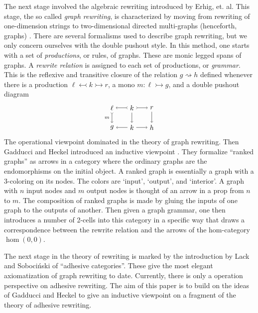 \documentclass{amsart}
\newcommand{\from}{\colon}
\newcommand{\monicto}{\rightarrowtail}
\newcommand{\dderiv}[2]{#1 \rightsquigarrow #2}
\newcommand{\monicgets}{\leftarrowtail}
\theoremstyle{remark}
\theoremstyle{definition}
\begin{document}
The next stage involved the algebraic rewriting introduced by Erhig,
et. al. This stage, the so called \emph{graph rewriting}, is
characterized by moving from rewriting of one-dimension strings to
two-dimensional directed multi-graphs (henceforth, graphs)
\cite{Ehrig_GraphGram}. There are several formalisms used to describe
graph rewriting, but we only concern ourselves with the double pushout
style. In this method, one starts with a set of \emph{productions}, or
rules, of graphs. These are monic legged spans of graphs. A
\emph{rewrite relation} is assigned to each set of productions, or
\emph{grammar}.  This is the reflexive and transitive closure of the
relation $ \dderiv{g}{h} $ defined whenever there is a production
$ \ell \monicgets k \monicto r $, a mono $ m \from \ell \monicto g $,
and a double pushout diagram
%
\[
  \begin{tikzpicture}
    \node (1t) at (0,1) {$ \ell $};
    \node (2t) at (1,1) {$ k $};
    \node (3t) at (2,1) {$ r $};
    \node (1b) at (0,0) {$ g $};
    \node (2b) at (1,0) {$ k $};
    \node (3b) at (2,0) {$ h $};
    \draw [>->] (2t) to node [] {\scriptsize{$  $}} (1t);
    \draw [>->] (2t) to node [] {\scriptsize{$  $}} (3t);
    \draw [->] (2b) to node [] {\scriptsize{$  $}} (1b);
    \draw [->] (2b) to node [] {\scriptsize{$  $}} (3b);
    \draw [>->] (1t) to node [left] {\scriptsize{$ m $}} (1b);
    \draw [->] (2t) to node [] {\scriptsize{$  $}} (2b);
    \draw [->] (3t) to node [] {\scriptsize{$  $}} (3b);
  \end{tikzpicture}
\]
% 
The operational viewpoint dominated in the theory of graph rewriting.
Then Gadducci and Heckel introduced an inductive viewpoint
\cite{Gadd_IndGraphTrans}. They formalize ``ranked graphs'' as arrows
in a category where the ordinary graphs are the endomorphisms on the
initial object. A ranked graph is essentially a graph with a
3-coloring on its nodes. The colors are `input', `output', and
`interior'. A graph with $ n $ input nodes and $ m $ output nodes is
thought of an arrow in a prop from $ n $ to $ m $. The composition of
ranked graphs is made by gluing the inputs of one graph to the
outputs of another. Then given a graph grammar, one then introduces a
number of 2-cells into this category in a specific way that draws a
correspondence between the rewrite relation and the arrows of the
hom-category $ \hom (0,0) $.

The next stage in the theory of rewriting is marked by the
introduction by Lack and Soboci\'{n}ski \cite{LackSobo_Adhesive} of
``adhesive categories''.  These give the most elegant axiomatization
of graph rewriting to date.  Currently, there is only a operation
perspective on adhesive rewriting.  The aim of this paper is to build
on the ideas of Gadducci and Heckel to give an inductive viewpoint on
a fragment of the theory of adhesive rewriting.
\end{document}
